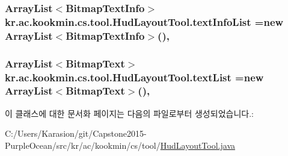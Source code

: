 \subsubsection[{text\+Info\+List}]{\setlength{\rightskip}{0pt plus 5cm}Array\+List$<$Bitmap\+Text\+Info$>$ kr.\+ac.\+kookmin.\+cs.\+tool.\+Hud\+Layout\+Tool.\+text\+Info\+List =new Array\+List$<$Bitmap\+Text\+Info$>$()\hspace{0.3cm}{\ttfamily [static]}, {\ttfamily [private]}}\label{classkr_1_1ac_1_1kookmin_1_1cs_1_1tool_1_1_hud_layout_tool_a028d96b28a4f07007430d9ac3d29eac9}
\hypertarget{classkr_1_1ac_1_1kookmin_1_1cs_1_1tool_1_1_hud_layout_tool_a494376a3549ec46802ef2de1ebf10bc1}{}
\subsubsection[{text\+List}]{\setlength{\rightskip}{0pt plus 5cm}Array\+List$<$Bitmap\+Text$>$ kr.\+ac.\+kookmin.\+cs.\+tool.\+Hud\+Layout\+Tool.\+text\+List =new Array\+List$<$Bitmap\+Text$>$()\hspace{0.3cm}{\ttfamily [static]}, {\ttfamily [private]}}\label{classkr_1_1ac_1_1kookmin_1_1cs_1_1tool_1_1_hud_layout_tool_a494376a3549ec46802ef2de1ebf10bc1}


이 클래스에 대한 문서화 페이지는 다음의 파일로부터 생성되었습니다.\+:\begin{DoxyCompactItemize}
\item 
C\+:/\+Users/\+Karasion/git/\+Capstone2015-\/\+Purple\+Ocean/src/kr/ac/kookmin/cs/tool/\hyperlink{_hud_layout_tool_8java}{Hud\+Layout\+Tool.\+java}\end{DoxyCompactItemize}
